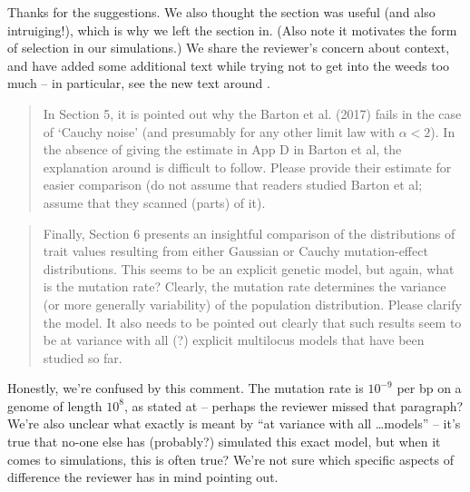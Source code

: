Thanks for the suggestions.
We also thought the section was useful (and also intruiging!),
which is why we left the section in.
(Also note it motivates the form of selection in our simulations.)
We share the reviewer's concern about context,
and have added some additional text
while trying not to get into the weeds too much
-- in particular, see the new text around .

\begin{quote}
In Section 5, it is pointed out why the Barton et al. (2017) fails in the case of ‘Cauchy
noise’ (and presumably for any other limit law with $\alpha < 2$). In the absence of giving the
estimate in App D in Barton et al, the explanation around  is difficult to
follow. Please provide their estimate for easier comparison (do not assume that readers
studied Barton et al; assume that they scanned (parts) of it).
\end{quote}


\begin{quote}
Finally, Section 6 presents an insightful comparison of the distributions of trait values
resulting from either Gaussian or Cauchy mutation-effect distributions. This seems to be
an explicit genetic model, but again, what is the mutation rate? Clearly, the mutation
rate determines the variance (or more generally variability) of the population distribution.
Please clarify the model. It also needs to be pointed out clearly that such results seem to
be at variance with all (?) explicit multilocus models that have been studied so far.
\end{quote}

Honestly, we're confused by this comment.
The mutation rate is $10^{-9}$ per bp on a genome of length $10^8$,
as stated at  -- perhaps the reviewer missed that paragraph?
We're also unclear what exactly is meant by ``at variance with all \ldots models'' --
it's true that no-one else has (probably?) simulated this exact model,
but when it comes to simulations, this is often true?
We're not sure which specific aspects of difference the reviewer has in mind pointing out.

